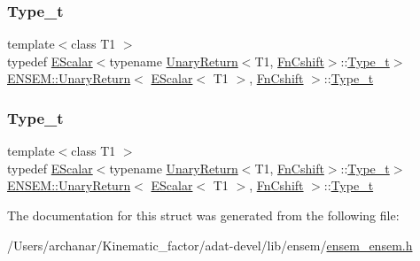 \subsubsection{\texorpdfstring{Type\_t}{Type\_t}\hspace{0.1cm}{\footnotesize\ttfamily [2/3]}}
{\footnotesize\ttfamily template$<$class T1 $>$ \\
typedef \mbox{\hyperlink{classENSEM_1_1EScalar}{E\+Scalar}}$<$typename \mbox{\hyperlink{structENSEM_1_1UnaryReturn}{Unary\+Return}}$<$T1, \mbox{\hyperlink{structENSEM_1_1FnCshift}{Fn\+Cshift}}$>$\+::\mbox{\hyperlink{structENSEM_1_1UnaryReturn_3_01EScalar_3_01T1_01_4_00_01FnCshift_01_4_accaabe891d4db03e846c40927db5ad5e}{Type\+\_\+t}}$>$ \mbox{\hyperlink{structENSEM_1_1UnaryReturn}{E\+N\+S\+E\+M\+::\+Unary\+Return}}$<$ \mbox{\hyperlink{classENSEM_1_1EScalar}{E\+Scalar}}$<$ T1 $>$, \mbox{\hyperlink{structENSEM_1_1FnCshift}{Fn\+Cshift}} $>$\+::\mbox{\hyperlink{structENSEM_1_1UnaryReturn_3_01EScalar_3_01T1_01_4_00_01FnCshift_01_4_accaabe891d4db03e846c40927db5ad5e}{Type\+\_\+t}}}

\mbox{\label{structENSEM_1_1UnaryReturn_3_01EScalar_3_01T1_01_4_00_01FnCshift_01_4_accaabe891d4db03e846c40927db5ad5e}} 
\subsubsection{\texorpdfstring{Type\_t}{Type\_t}\hspace{0.1cm}{\footnotesize\ttfamily [3/3]}}
{\footnotesize\ttfamily template$<$class T1 $>$ \\
typedef \mbox{\hyperlink{classENSEM_1_1EScalar}{E\+Scalar}}$<$typename \mbox{\hyperlink{structENSEM_1_1UnaryReturn}{Unary\+Return}}$<$T1, \mbox{\hyperlink{structENSEM_1_1FnCshift}{Fn\+Cshift}}$>$\+::\mbox{\hyperlink{structENSEM_1_1UnaryReturn_3_01EScalar_3_01T1_01_4_00_01FnCshift_01_4_accaabe891d4db03e846c40927db5ad5e}{Type\+\_\+t}}$>$ \mbox{\hyperlink{structENSEM_1_1UnaryReturn}{E\+N\+S\+E\+M\+::\+Unary\+Return}}$<$ \mbox{\hyperlink{classENSEM_1_1EScalar}{E\+Scalar}}$<$ T1 $>$, \mbox{\hyperlink{structENSEM_1_1FnCshift}{Fn\+Cshift}} $>$\+::\mbox{\hyperlink{structENSEM_1_1UnaryReturn_3_01EScalar_3_01T1_01_4_00_01FnCshift_01_4_accaabe891d4db03e846c40927db5ad5e}{Type\+\_\+t}}}



The documentation for this struct was generated from the following file\+:\begin{DoxyCompactItemize}
\item 
/\+Users/archanar/\+Kinematic\+\_\+factor/adat-\/devel/lib/ensem/\mbox{\hyperlink{adat-devel_2lib_2ensem_2ensem__ensem_8h}{ensem\+\_\+ensem.\+h}}\end{DoxyCompactItemize}
